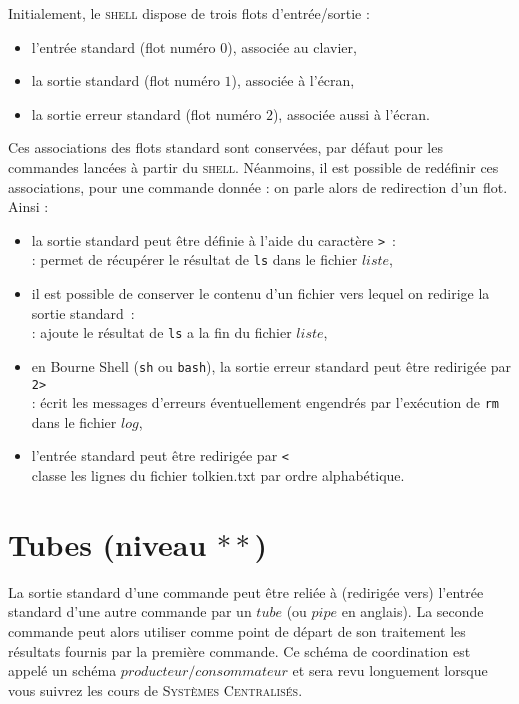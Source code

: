 \documentclass[a4paper,11pt]{article}
\newcommand{\shell}{\textsc{shell}}
\begin{document}
Initialement, le \shell{} dispose de trois flots d'entrée/sortie :
\begin{itemize}
  \item l'entrée standard (flot numéro $0$), associée au clavier,
  \item la sortie standard (flot numéro $1$), associée à l'écran,
  \item la sortie erreur standard (flot numéro $2$), associée aussi à l'écran.
\end{itemize}
Ces associations des flots standard sont conservées, par défaut pour les
commandes lancées à partir du \shell. Néanmoins, il est possible de redéfinir
ces associations, pour une commande donnée : on parle alors de redirection
d'un flot. Ainsi :
\begin{itemize}
  \item la sortie standard peut être définie à l'aide du caractère \verb!>! :\\
         : permet de récupérer le résultat de  \verb!ls!
        dans le fichier $liste$,
\\
  \item il est possible de conserver le contenu d'un fichier vers lequel on
        redirige la sortie standard :\\
         : ajoute le résultat de \verb!ls!  a la fin du
        fichier $liste$,
\\
  \item en Bourne Shell  (\verb!sh! ou \verb!bash!), la sortie erreur standard
        peut être redirigée par  \verb!2>!\\
         : écrit les messages d'erreurs éventuellement
        engendrés par l'exécution de  \verb!rm!  dans le fichier $log$,
\\
  \item l'entrée standard peut être redirigée par  \verb!<!\\
         classe les lignes du fichier tolkien.txt par
        ordre alphabétique.

\end{itemize}

\section{Tubes (niveau $**$)}

La sortie standard d'une commande peut être reliée à (redirigée vers) l'entrée
standard d'une autre commande par un $tube$ (ou $pipe$ en anglais).
La seconde commande peut alors utiliser comme  point de départ de son
traitement les résultats fournis par la première commande. Ce schéma de
coordination est appelé un schéma $producteur/consommateur$ et sera revu
longuement lorsque vous suivrez les cours de \textsc{Systèmes Centralisés}.
\end{document}
